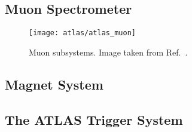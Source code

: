 \subsection{Muon Spectrometer}

\begin{figure}[htbp]
  \centering

  \texttt{[image: atlas/atlas\_muon]}

  \caption{Muon subsystems. Image taken from Ref.~\cite{Pequenao:1095929}.}%
  \label{fig:atlas_muon_system}

\end{figure}

\subsection{Magnet System}

\subsection{The ATLAS Trigger System}

